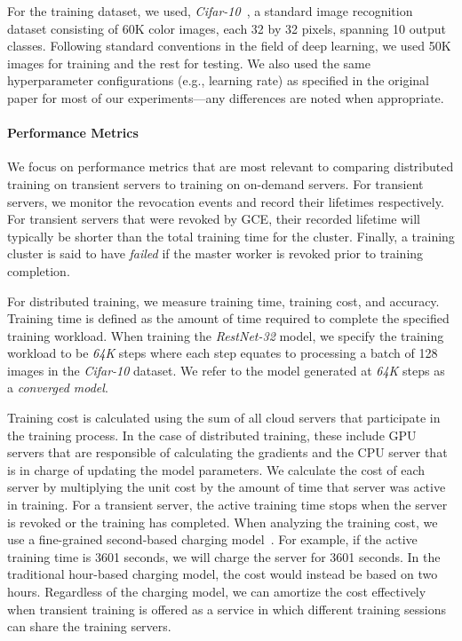 For the training dataset, we used, \emph{Cifar-10}~\cite{krizhevsky2009learning}, a standard image
recognition dataset consisting of 60K color images, each 32 by 32 pixels,
spanning 10 output classes. Following standard conventions in the field of deep
learning, we used 50K images for training and the rest for testing. We also
used the same hyperparameter configurations (e.g., learning rate) as specified
in the original paper for most of our experiments---any differences are noted
when appropriate.

\paragraph{Performance Metrics}

We focus on performance metrics that are most  relevant  to comparing
distributed training on transient servers to training on on-demand servers.
For transient servers, we monitor the revocation events and record their 
lifetimes respectively. For transient servers that were revoked by
GCE, their recorded lifetime will typically be shorter than the total training
time for the cluster.  Finally, a training cluster is said to have
\emph{failed} if the master worker is revoked prior to training completion.

For distributed training, we measure training time, training cost, and
accuracy.  Training time is defined as the amount of time required to complete
the specified training workload. When training the \emph{RestNet-32} model, we
specify the training workload to be \emph{64K} steps where each step equates to
processing a batch of 128 images in the \emph{Cifar-10} dataset. We refer to the model 
generated at  \emph{64K} steps as a \emph{converged model}.
 
Training cost is calculated using the sum of all cloud servers that participate
in the training process. In the case of distributed training, these include GPU
servers that are responsible of calculating the gradients and the CPU server
that is in charge of updating the model parameters. We calculate the cost of
each server by multiplying the unit cost by the amount of time that server was
active in training. For a transient server, the active training time stops when
the server is revoked or the training has completed. When analyzing the
training cost, we use a fine-grained second-based charging model~\cite{billing}. For
example, if the active training time is 3601 seconds, we will charge the server
for 3601 seconds. In the traditional hour-based charging model, the cost would
instead be based on two hours. Regardless of the charging model, we can
amortize the cost effectively when  transient training is offered as a service
in which different training sessions can share the training servers. 

